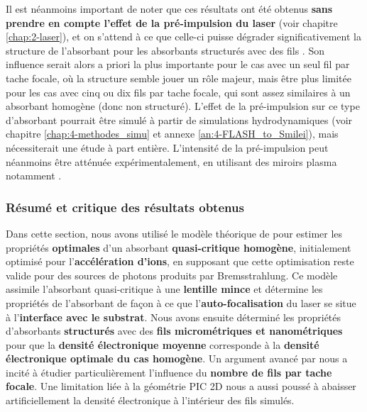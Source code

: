 \begin{refsection}
Il est néanmoins important de noter que ces résultats ont été obtenus \textbf{sans prendre en compte l'effet de la pré-impulsion du laser} (voir chapitre \ref{chap:2-laser}), et on s'attend à ce que celle-ci puisse dégrader significativement la structure de l'absorbant pour les absorbants structurés avec des fils \parencite{dozieres_2019, cristoforetti_2017}. Son influence serait alors a priori la plus importante pour le cas avec un seul fil par tache focale, où la structure semble jouer un rôle majeur, mais être plus limitée pour les cas avec cinq ou dix fils par tache focale, qui sont assez similaires à un absorbant homogène (donc non structuré). L'effet de la pré-impulsion sur ce type d'absorbant pourrait être simulé à partir de simulations hydrodynamiques (voir chapitre \ref{chap:4-methodes_simu} et annexe \ref{an:4-FLASH_to_Smilei}), mais nécessiterait une étude à part entière. L'intensité de la pré-impulsion peut néanmoins être atténuée expérimentalement, en utilisant des miroirs plasma notamment \parencite{kapteyn_1991, thaury_2007}.

\subsubsection{Résumé et critique des résultats obtenus}

Dans cette section, nous avons utilisé le modèle théorique de \cite{pazzaglia_2020} pour estimer les propriétés \textbf{optimales} d'un absorbant \textbf{quasi-critique homogène}, initialement optimisé pour l'\textbf{accélération d'ions}, en supposant que cette optimisation reste valide pour des sources de photons produits par Bremsstrahlung. Ce modèle assimile l'absorbant quasi-critique à une \textbf{lentille mince} et détermine les propriétés de l'absorbant de façon à ce que l'\textbf{auto-focalisation} du laser se situe à l'\textbf{interface avec le substrat}. Nous avons ensuite déterminé les propriétés d'absorbants \textbf{structurés} avec des \textbf{fils micrométriques et nanométriques} pour que la \textbf{densité électronique moyenne} corresponde à la \textbf{densité électronique optimale du cas homogène}. Un argument avancé par \cite{dozieres_2019} nous a incité à étudier particulièrement l'influence du \textbf{nombre de fils par tache focale}. Une limitation liée à la géométrie PIC 2D nous a aussi poussé à abaisser artificiellement la densité électronique à l'intérieur des fils simulés. 


\end{refsection}
